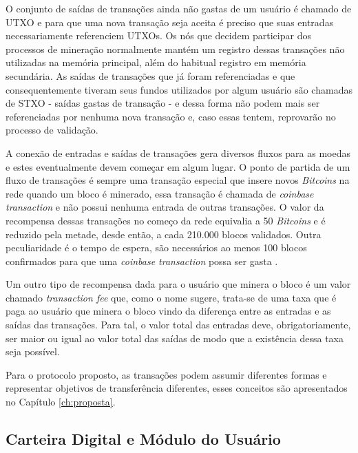 %
O conjunto de saídas de transações ainda não gastas de um usuário é chamado de \ac{UTXO} e para que uma nova transação seja aceita é preciso que suas entradas necessariamente referenciem \acp{UTXO}. Os nós que decidem participar dos processos de mineração normalmente mantém um registro dessas transações não utilizadas na memória principal, além do habitual registro em memória secundária. As saídas de transações que já foram referenciadas e que consequentemente tiveram seus fundos utilizados por algum usuário são chamadas de \ac{STXO} - saídas gastas de transação - e dessa forma não podem mais ser referenciadas por nenhuma nova transação e, caso essas tentem, reprovarão no processo de validação.

%
A conexão de entradas e saídas de transações gera diversos fluxos para as moedas e estes eventualmente devem começar em algum lugar. O ponto de partida de um fluxo de transações é sempre uma transação especial que insere novos \textit{Bitcoins} na rede quando um bloco é minerado, essa transação é chamada de \textit{coinbase transaction} e não possui nenhuma entrada de outras transações. O valor da recompensa dessas transações no começo da rede equivalia a 50 \textit{Bitcoins} e é reduzido pela metade, desde então, a cada 210.000 blocos validados. Outra peculiaridade é o tempo de espera, são necessários ao menos 100 blocos confirmados para que uma \textit{coinbase transaction} possa ser gasta \cite{blockchain:survey_bitcoin}.

%
Um outro tipo de recompensa dada para o usuário que minera o bloco é um valor chamado \textit{transaction fee} que, como o nome sugere, trata-se de uma taxa que é paga ao usuário que minera o bloco vindo da diferença entre as entradas e as saídas das transações. Para tal, o valor total das entradas deve, obrigatoriamente, ser maior ou igual ao valor total das saídas de modo que a existência dessa taxa seja possível.

Para o protocolo proposto, as transações podem assumir diferentes formas e representar objetivos de transferência diferentes, esses conceitos são apresentados no Capítulo \ref{ch:proposta}.

\subsection{Carteira Digital e Módulo do Usuário}
\label{subsec:blockchain:carteira}

